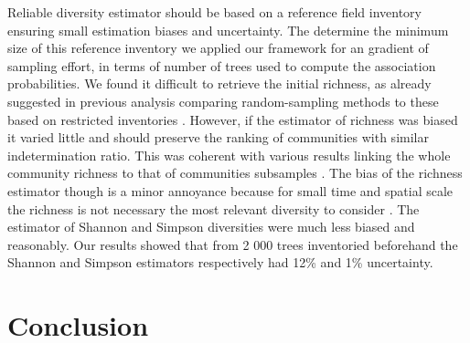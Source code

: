 \documentclass[fleqn,10pt]{ArtEcoFoG} %
\begin{document}
Reliable diversity estimator should be based on a reference field
inventory ensuring small estimation biases and uncertainty. The
determine the minimum size of this reference inventory we applied our
framework for an gradient of sampling effort, in terms of number of
trees used to compute the association probabilities. We found it
difficult to retrieve the initial richness, as already suggested in
previous analysis comparing random-sampling methods to these based on
restricted inventories \citep{Higgins2004}. However, if the estimator of
richness was biased it varied little and should preserve the ranking of
communities with similar indetermination ratio. This was coherent with
various results linking the whole community richness to that of
communities subsamples \citep{Vellend2008}. The bias of the richness
estimator though is a minor annoyance because for small time and spatial
scale the richness is not necessary the most relevant diversity to
consider \citep{Baraloto2012a, Berry2008a, Cannon1998, Plumptre1996}.
The estimator of Shannon and Simpson diversities were much less biased
and reasonably. Our results showed that from 2 000 trees inventoried
beforehand the Shannon and Simpson estimators respectively had 12\% and
1\% uncertainty.

\section{Conclusion}\label{conclusion}
\end{document}
